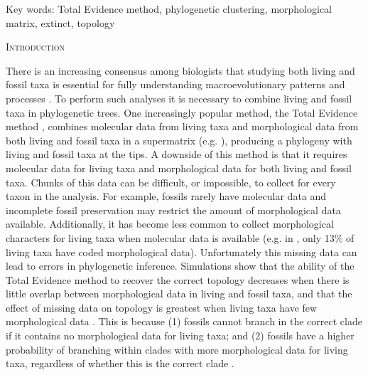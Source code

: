 \documentclass[12pt,letterpaper]{article}
\renewcommand{\section}[1]{%
\bigskip
\begin{center}
\begin{Large}
\normalfont\scshape #1
\medskip
\end{Large}
\end{center}}
\begin{document}
\noindent Key words: Total Evidence method, phylogenetic clustering, morphological matrix, extinct, topology\\

\vspace{1.5in}

%
%
\newpage 
\section{Introduction}

There is an increasing consensus among biologists that studying both living and fossil taxa is essential for fully understanding macroevolutionary patterns and processes \cite{slaterunifying2013,fritzdiversity2013}.
To perform such analyses it is necessary to combine living and fossil taxa in phylogenetic trees.
One increasingly popular method, the Total Evidence method \cite{ronquista2012}, combines molecular data from living taxa and morphological data from both living and fossil taxa in a supermatrix (e.g. \cite{pyrondivergence2011,ronquista2012,schragocombining2013,slaterunifying2013,beckancient2014}), producing a phylogeny with living and fossil taxa at the tips. 
A downside of this method is that it requires molecular data for living taxa and morphological data for both living and fossil taxa.
Chunks of this data can be difficult, or impossible, to collect for every taxon in the analysis.
For example, fossils rarely have molecular data and incomplete fossil preservation may restrict the amount of morphological data available.
Additionally, it has become less common to collect morphological characters for living taxa when molecular data is available (e.g. in \cite{slaterphylogenetic2013}, only 13\% of living taxa have coded morphological data).
Unfortunately this missing data can lead to errors in phylogenetic inference.
Simulations show that the ability of the Total Evidence method to recover the correct topology decreases when there is little overlap between morphological data in living and fossil taxa, and that the effect of missing data on topology is greatest when living taxa have few morphological data \cite{GuillermeCooper}.
This is because (1) fossils cannot branch in the correct clade if it contains no morphological data for living taxa; and (2) fossils have a higher probability of branching within clades with more morphological data for living taxa, regardless of whether this is the correct clade \cite{GuillermeCooper}. 
\end{document}
